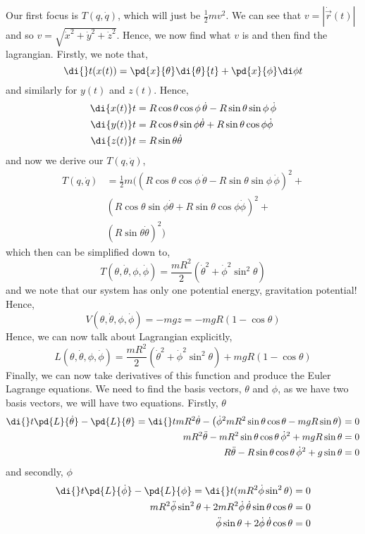 Our first focus is $T(q, \dot q)$, which will just be $\frac{1}{2}mv^2$. We can see that $v = |\dot{\vec{r}}(t)|$ and so $v = \sqrt{\dot x^2 + \dot y^2 + \dot z^2}$. Hence, we now find what $v$ is and then find the lagrangian. Firstly, we note that,
$$ \di {} t (x(t)) = \pd{x}{\theta}\di {\theta}{t} + \pd{x}{\phi}\di \phi t $$
and similarly for $y(t)$ and $z(t)$. Hence,
\begin{align*}
  \di {x(t)} t &= R\cos \theta \cos \phi \,\dot \theta - R\sin \theta \sin \phi \,\dot \phi\\
  \di {y(t)} t &= R\cos \theta\sin\phi \dot \theta + R\sin \theta\cos \phi \dot \phi\\
  \di {z(t)} t &= R\sin \theta\dot \theta
\end{align*}
and now we derive our $T(q, \dot q)$,
\begin{align*}
  T(q, \dot q) &= \frac{1}{2}m \bigg( \left(R\cos \theta \cos \phi \,\dot \theta - R\sin \theta \sin \phi \,\dot \phi\right)^2 + \\
  & \left(R \cos \theta\sin\phi \dot \theta + R\sin \theta\cos \phi \dot \phi \right)^2 + \\
  & \left( R\sin \theta\dot \theta \right)^2 \bigg)
\end{align*}
which then can be simplified down to,
$$ T(\theta, \dot \theta, \phi, \dot \phi) = \frac{mR^2}{2}\left( \dot \theta^2 + \dot \phi ^2\sin^2 \theta \right) $$
and we note that our system has only one potential energy, gravitation potential! Hence,
$$ V(\theta, \dot \theta, \phi, \dot \phi) = -mgz = -mgR(1 - \cos \theta) $$
Hence, we can now talk about Lagrangian explicitly,
$$ L(\theta, \dot \theta, \phi, \dot \phi) = \frac{mR^2}{2} \left( \dot \theta^2 + \dot\phi^2\sin^2 \theta\right) + mgR\left(1 - \cos \theta\right) $$
Finally, we can now take derivatives of this function and produce the Euler Lagrange equations. We need to find the basis vectors, $\theta$ and $\phi$, as we have two basis vectors, we will have two equations. Firstly, $\theta$
\begin{align*}
  \di {} t \pd{L}{\dot\theta} - \pd{L}{\theta} = \di {} t {mR^2 \dot \theta} - \left( \dot\phi^2mR^2\sin\theta\cos\theta - mgR\sin\theta \right) &= 0\\
  mR^2\ddot{\theta} - mR^2\sin \theta \cos \theta\,\dot \phi^2 + mgR\sin \theta &= 0\\
  R\ddot{\theta} - R\sin \theta \cos \theta\,\dot \phi^2 + g\sin \theta &= 0
\end{align*}
and secondly, $\phi$
\begin{align*}
  \di {} t \pd{L}{\dot\phi} - \pd{L}{\phi} = \di {} t  (mR^2 \dot \phi \sin^2 \theta) &= 0\\
  mR^2\ddot\phi\sin^2 \theta + 2mR^2\dot \phi\,\dot\theta \sin \theta\cos \theta &= 0\\
  \ddot\phi\sin \theta + 2\dot \phi\,\dot\theta\cos \theta &= 0\\
\end{align*}

